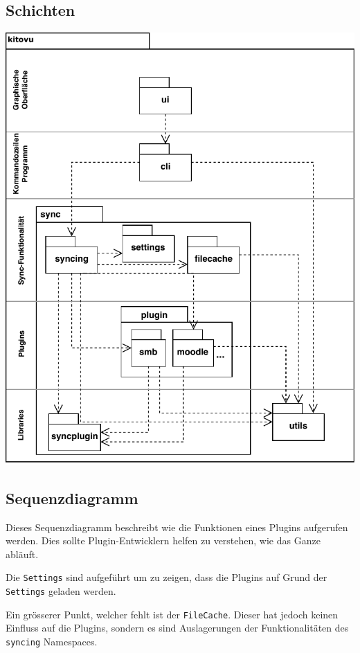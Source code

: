 \documentclass[a4paper]{article}
\begin{document}

\subsection{Schichten}

\includegraphics[width=40em]{./img/schichtendiagramm.pdf}

\newpage

\subsection{Sequenzdiagramm}

Dieses Sequenzdiagramm beschreibt wie die Funktionen eines Plugins aufgerufen werden.
Dies sollte Plugin-Entwicklern helfen zu verstehen, wie das Ganze abläuft.

Die \verb|Settings| sind aufgeführt um zu zeigen, dass die Plugins auf Grund der \verb|Settings| geladen werden.

Ein grösserer Punkt, welcher fehlt ist der \verb|FileCache|.
Dieser hat jedoch keinen Einfluss auf die Plugins, sondern es sind Auslagerungen der Funktionalitäten des \verb|syncing| Namespaces.
\end{document}
